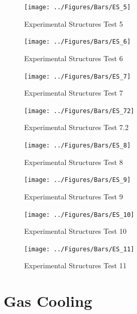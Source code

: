 \documentclass[12pt,oneside]{book}
\begin{document}
\clearpage

\begin{figure}[!ht]
	\texttt{[image: ../Figures/Bars/ES\_5]}
	\caption{Experimental Structures Test 5}
	\label{fig:Experimental_Structures_Test_5}
\end{figure}

\begin{figure}[!ht]
	\texttt{[image: ../Figures/Bars/ES\_6]}
	\caption{Experimental Structures Test 6}
	\label{fig:Experimental_Structures_Test_6}
\end{figure}

\begin{figure}[!ht]
	\texttt{[image: ../Figures/Bars/ES\_7]}
	\caption{Experimental Structures Test 7}
	\label{fig:Experimental_Structures_Test_7}
\end{figure}

\begin{figure}[!ht]
	\texttt{[image: ../Figures/Bars/ES\_72]}
	\caption{Experimental Structures Test 7.2}
	\label{fig:Experimental_Structures_Test_7.2}
\end{figure}

\clearpage

\begin{figure}[!ht]
	\texttt{[image: ../Figures/Bars/ES\_8]}
	\caption{Experimental Structures Test 8}
	\label{fig:Experimental_Structures_Test_8}
\end{figure}

\begin{figure}[!ht]
	\texttt{[image: ../Figures/Bars/ES\_9]}
	\caption{Experimental Structures Test 9}
	\label{fig:Experimental_Structures_Test_9}
\end{figure}

\begin{figure}[!ht]
	\texttt{[image: ../Figures/Bars/ES\_10]}
	\caption{Experimental Structures Test 10}
	\label{fig:Experimental_Structures_Test_10}
\end{figure}

\begin{figure}[!ht]
	\texttt{[image: ../Figures/Bars/ES\_11]}
	\caption{Experimental Structures Test 11}
	\label{fig:Experimental_Structures_Test_11}
\end{figure}

\clearpage

\section{Gas Cooling}
\label{sec:Gas_Cooling}
\end{document}
